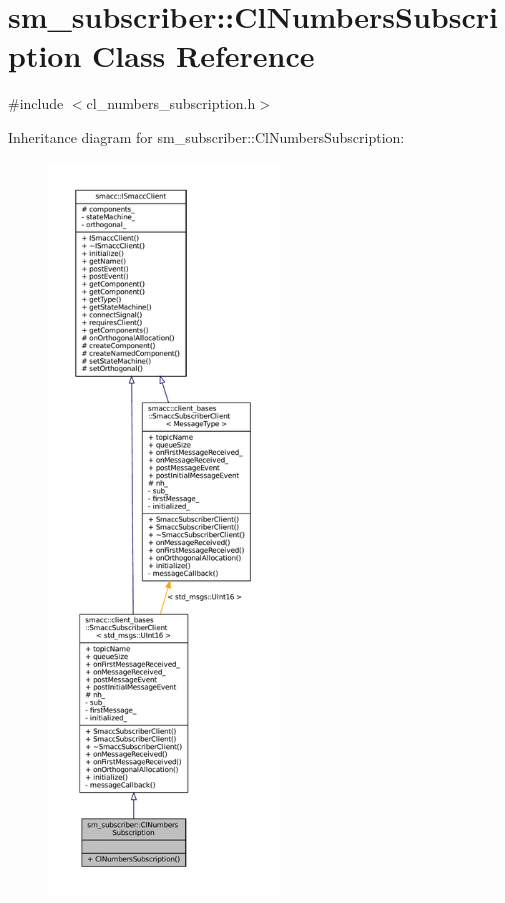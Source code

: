 \hypertarget{classsm__subscriber_1_1ClNumbersSubscription}{}\section{sm\+\_\+subscriber\+:\+:Cl\+Numbers\+Subscription Class Reference}
\label{classsm__subscriber_1_1ClNumbersSubscription}


{\ttfamily \#include $<$cl\+\_\+numbers\+\_\+subscription.\+h$>$}



Inheritance diagram for sm\+\_\+subscriber\+:\+:Cl\+Numbers\+Subscription\+:
\nopagebreak
\begin{figure}[H]
\begin{center}
\leavevmode
\includegraphics[height=550pt]{classsm__subscriber_1_1ClNumbersSubscription__inherit__graph}
\end{center}
\end{figure}


